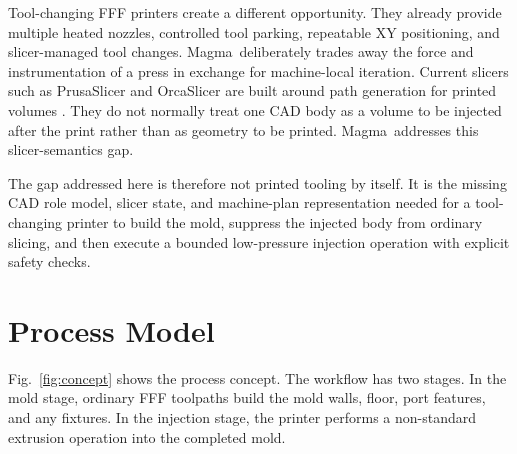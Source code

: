 \documentclass[conference]{IEEEtran}
\newcommand{\magma}{Magma}
\begin{document}
Tool-changing FFF printers create a different opportunity. They already provide multiple heated nozzles, controlled tool parking, repeatable XY positioning, and slicer-managed tool changes. \magma\ deliberately trades away the force and instrumentation of a press in exchange for machine-local iteration. Current slicers such as PrusaSlicer and OrcaSlicer are built around path generation for printed volumes \cite{prusaslicer,orcaslicer}. They do not normally treat one CAD body as a volume to be injected after the print rather than as geometry to be printed. \magma\ addresses this slicer-semantics gap.

The gap addressed here is therefore not printed tooling by itself. It is the missing CAD role model, slicer state, and machine-plan representation needed for a tool-changing printer to build the mold, suppress the injected body from ordinary slicing, and then execute a bounded low-pressure injection operation with explicit safety checks.

\section{Process Model}
Fig.~\ref{fig:concept} shows the process concept. The workflow has two stages. In the mold stage, ordinary FFF toolpaths build the mold walls, floor, port features, and any fixtures. In the injection stage, the printer performs a non-standard extrusion operation into the completed mold.
\end{document}
